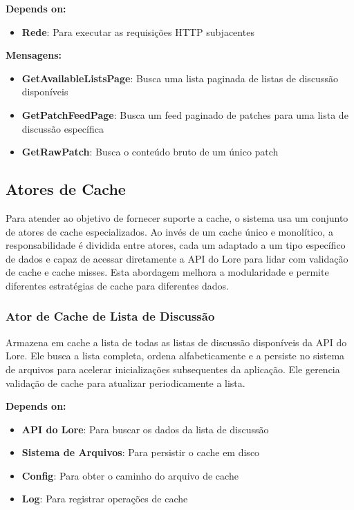 \textbf{Depends on:}

\begin{itemize}
    \item \textbf{Rede}: Para executar as requisições HTTP subjacentes
\end{itemize}

\textbf{Mensagens:}

\begin{itemize}
    \item \textbf{GetAvailableListsPage}: Busca uma lista paginada de listas de discussão disponíveis
    \item \textbf{GetPatchFeedPage}: Busca um feed paginado de patches para uma lista de discussão específica
    \item \textbf{GetRawPatch}: Busca o conteúdo bruto de um único patch
\end{itemize}

\subsection{Atores de Cache}

Para atender ao objetivo de fornecer suporte a cache, o sistema usa um conjunto de atores de cache especializados. Ao invés de um cache único e monolítico, a responsabilidade é dividida entre atores, cada um adaptado a um tipo específico de dados e capaz de acessar diretamente a API do Lore para lidar com validação de cache e cache misses. Esta abordagem melhora a modularidade e permite diferentes estratégias de cache para diferentes dados.

\subsubsection{Ator de Cache de Lista de Discussão}

Armazena em cache a lista de todas as listas de discussão disponíveis da API do Lore. Ele busca a lista completa, ordena alfabeticamente e a persiste no sistema de arquivos para acelerar inicializações subsequentes da aplicação. Ele gerencia validação de cache para atualizar periodicamente a lista.

\textbf{Depends on:}

\begin{itemize}
    \item \textbf{API do Lore}: Para buscar os dados da lista de discussão
    \item \textbf{Sistema de Arquivos}: Para persistir o cache em disco
    \item \textbf{Config}: Para obter o caminho do arquivo de cache
    \item \textbf{Log}: Para registrar operações de cache
\end{itemize}

